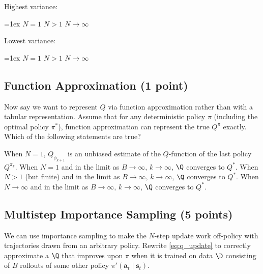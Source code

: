 \def\highest{} %
\def\lowest{} %
\ifsolutions\solve\thesubsection\fi
\begin{minipage}{0.49\linewidth}
Highest variance:\smallskip
\begin{itemize}\itemsep=1ex
    \checkeditem\highest1 $N = 1$
    \checkeditem\highest2 $N > 1$
    \checkeditem\highest3 $N \to \infty$
\end{itemize}
\end{minipage}
\begin{minipage}{0.49\linewidth}
Lowest variance:\smallskip
\begin{itemize}\itemsep=1ex
    \checkeditem\lowest1 $N = 1$
    \checkeditem\lowest2 $N > 1$
    \checkeditem\lowest3 $N \to \infty$
\end{itemize}
\end{minipage}

\subsection{Function Approximation (1 point)}
\label{q:function_approximation}
Now say we want to represent $Q$ via function approximation rather than with a tabular representation. Assume that for any deterministic policy $\pi$ (including the optimal policy $\pi^*$), function approximation can represent the true $Q^\pi$ exactly.
Which of the following statements are true?

\def\answer{} %
\ifsolutions\solve\thesubsection\fi
\begin{itemize}
    \checkeditem\answer1 When $N = 1$, $Q_{\phi_{k+1}}$ is an unbiased estimate of the $Q$-function of the last policy $Q^{\pi_k}$.
    \checkeditem\answer2 When $N = 1$ and in the limit as $B\to\infty,\,k \to \infty$, $\Q$ converges to $Q^*$.
    \checkeditem\answer3 When $N > 1$ (but finite) and in the limit as $B\to\infty,\,k \to \infty$, $\Q$ converges to $Q^*$.
    \checkeditem\answer4 When $N \to \infty$ and in the limit as $B \to \infty,\,k \to \infty$, $\Q$ converges to $Q^*$.
\end{itemize}

\subsection{Multistep Importance Sampling (5 points)}
\label{q:importance_sampling}

We can use importance sampling to make the $N$-step update work off-policy with trajectories drawn from an arbitrary policy. Rewrite \eqref{eq:q_update} to correctly approximate a $\Q$ that improves upon $\pi$ when it is trained on data $\D$ consisting of $B$ rollouts of some other policy $\pi'(\mathbf a_t\mid\mathbf s_t)$. 

